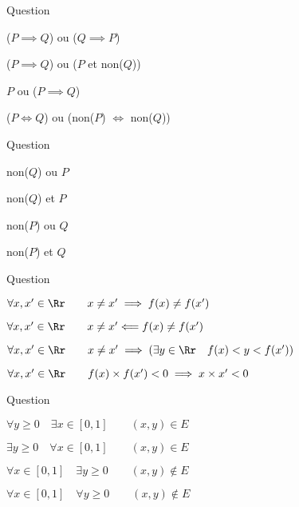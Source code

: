 \begin{multi}[multiple,feedback=
{Tester les quatre possibilités selon que \(P,Q\) sont vraies ou fausses.
}]{Question}
    \item* (\(P \implies Q\)) ou (\(Q \implies P\))
    \item* (\(P \implies Q\)) ou (\(P\) et non(\(Q\)))
    \item* \(P\) ou (\(P \implies Q\))
    \item (\(P \iff Q\)) ou (non(\(P\)) \(\iff\) non(\(Q\)))
\end{multi}


\begin{multi}[multiple,feedback=
{La définition (à connaître) de "\(P \implies Q\)" est "non(\(P\)) ou \(Q\)".
}]{Question}
    \item* non(\(Q\)) ou \(P\)
    \item non(\(Q\)) et \(P\)
    \item non(\(P\)) ou \(Q\)
    \item non(\(P\)) et \(Q\)
\end{multi}


\begin{multi}[multiple,feedback=
{Dessiner le graphe de \(f\) pour mieux comprendre ! 
Même si \(f(x) \neq f(x')\) cela ne veut pas dire que \(f(x) < f(x')\), l'inégalité pourrait être dans l'autre sens.
}]{Question}
    \item* \(\forall x,x' \in \Rr  \qquad x \neq x' \implies f(x) \neq f(x')\)
    \item* \(\forall x,x' \in \Rr  \qquad x \neq x' \Longleftarrow f(x) \neq f(x')\)
    \item \(\forall x,x' \in \Rr  \qquad x \neq x' \implies (\exists y \in \Rr \quad f(x) < y < f(x'))\)
    \item* \(\forall x,x' \in \Rr  \qquad  f(x)\times f(x') < 0 \implies x\times x' < 0\)
\end{multi}


\begin{multi}[multiple,feedback=
{Faire un dessin de l'ensemble \(E\).
}]{Question}
    \item* \(\forall y \ge 0 \quad \exists x \in [0,1] \qquad (x,y) \in E\)
    \item* \(\exists y \ge 0 \quad \forall x \in [0,1] \qquad (x,y) \in E\)
    \item \(\forall x \in [0,1] \quad \exists y \ge 0 \qquad (x,y) \notin E\)
    \item \(\forall x \in [0,1] \quad \forall y \ge 0 \qquad (x,y) \notin E\)
\end{multi}


